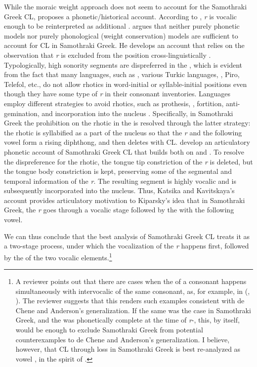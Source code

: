 \documentclass[output=paper,
modfonts
]{LSP/langsci}
\begin{document}
While the moraic weight approach does not seem to account for the
Samothraki Greek CL, \citet{kavitskaya2002} proposes a phonetic/historical
account. According to \citet[99]{kavitskaya2002}, \emph{r} is vocalic enough
to be reinterpreted as additional . \citet{kiparsky2011k} argues
that neither purely phonetic models nor purely phonological (weight
conservation) models are sufficient to account for CL in Samothraki
Greek. He develops an account that relies on the observation that
\emph{r} is excluded from the  position cross-linguistically \citep{zec2007}. 
Typologically, high sonority segments are dispreferred in the
, which is evident from the fact that many languages, such as
, various Turkic languages, , Piro, Telefol, etc., do not
allow rhotics in word-initial or syllable-initial positions \citep{deLacy2001,smith2003k} even though they have some type of \emph{r} in their
consonant inventories. Languages employ different strategies to avoid
 rhotics, such as prothesis, , fortition, anti-gemination,
and incorporation into the nucleus \citep[26]{kiparsky2011k}. Specifically, in
Samothraki Greek the prohibition on the rhotic in the  is resolved
through the latter strategy: the rhotic is syllabified as a part of the
nucleus so that the \emph{r} and the following vowel form a rising
diphthong, and then deletes with CL. \citet{katsika2015}
develop an articulatory phonetic account of Samothraki Greek CL that
builds both on \citet{kavitskaya2002} and \citet{kiparsky2011k}. To resolve the
dispreference for the  rhotic, the tongue tip constriction of the
\emph{r} is deleted, but the tongue body constriction is kept,
preserving some of the segmental and temporal information of the
\emph{r}. The resulting segment is highly vocalic and is subsequently
incorporated into the nucleus. Thus, Katsika and Kavitskaya's \citeyearpar{katsika2015}
account provides articulatory motivation to Kiparsky's idea that in
Samothraki Greek, the  \emph{r} goes through a vocalic stage followed by
the  with the following vowel.

We can thus conclude that the best analysis of Samothraki Greek CL
treats it as a two-stage process, under which the vocalization of the
 \emph{r} happens first, followed by the  of the two
vocalic elements.\footnote{A reviewer points out that there are cases
  when the  of a  consonant happens simultaneously with
  intervocalic  of the same consonant, as, for example, in
   (\citealt{deChene1979}, \citealt[23]{kavitskaya2002}). The
  reviewer suggests that this renders such examples consistent with de
  Chene and Anderson's generalization. If the same was the case in
  Samothraki Greek, and the  was phonetically complete at
  the time of \emph{r}-, this, by itself, would be enough to
  exclude Samothraki Greek from potential counterexamples to de Chene
  and Anderson's generalization. I believe, however, that CL through
   loss in Samothraki Greek is best re-analyzed as vowel
  , in the spirit of \citet{kiparsky2011k}.}
\end{document}
